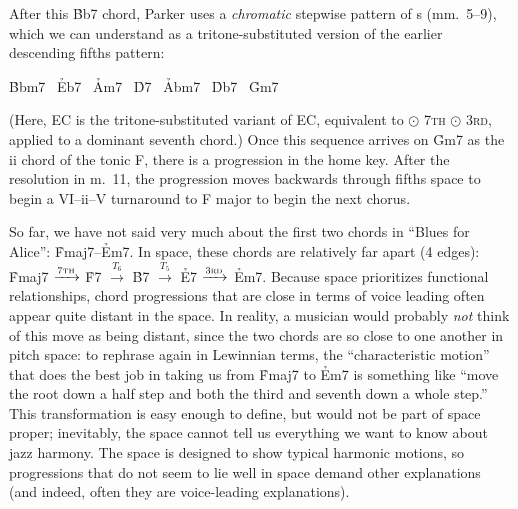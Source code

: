 After this \h{Bb7} chord, Parker uses a \emph{chromatic} stepwise pattern of \tf{}s
(mm.~5--9), which we can understand as a tritone-substituted version of the
earlier descending fifths pattern:

\begin{center}
  \h{Bbm7} \TFarrow\ \h{Eb7} \ECTarrow\
  \h{Am7}  \TFarrow\ \h{D7}  \ECTarrow\
  \h{Abm7} \TFarrow\ \h{Db7} \ECTarrow\
  \h{Gm7}
\end{center}

\noindent (Here, EC is the tritone-substituted variant of EC,
equivalent to \tft $\odot$ \textsc{7th} $\odot$ \textsc{3rd}, applied to a
dominant seventh chord.) Once this sequence arrives on \h{Gm7} as the ii chord
of the tonic F, there is a \tfo progression in the home key. After the
resolution in m.~11, the progression moves backwards through fifths space to
begin a VI--ii--V turnaround to F major to begin the next chorus.\fn{tft-8}

So far, we have not said very much about the first two chords in ``Blues for
Alice'': \h{Fmaj7}--\h{Em7}. In \tf space, these chords are relatively far
apart (4 edges): \h{Fmaj7} $\xrightarrow{\text{\textsc{7th}}}$ \h{F7} $\xrightarrow{T_6}$
\h{B7} $\xrightarrow{T_5}$ \h{E7} $\xrightarrow{\text{\textsc{3rd}}}$ \h{Em7}.
Because \tf space prioritizes functional relationships, chord progressions
that are close in terms of voice leading often appear quite distant in the
space. In reality, a musician would probably \emph{not} think of this move as
being distant, since the two chords are so close to one another
in pitch space: to rephrase again in Lewinnian terms, the ``characteristic
motion'' that does the best job in taking us from \h{Fmaj7} to \h{Em7} is
something like ``move the root down a half step and both the third and seventh
down a whole step.'' This transformation is easy enough to define, but would
not be part of \tf space proper; inevitably, the space cannot tell us
everything we want to know about jazz harmony. The space is designed to show
typical harmonic motions, so progressions that do not seem to lie well in \tf
space demand other explanations (and indeed, often they are voice-leading
explanations).






